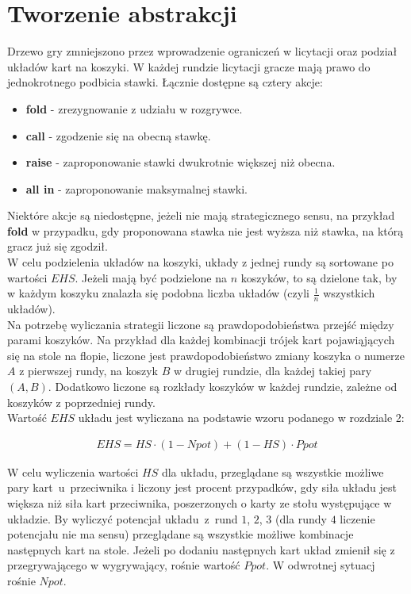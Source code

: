 \documentclass[magisterska]{pracamgr}
\begin{document}
\section{Tworzenie abstrakcji}
\label{koszyki-opis}

Drzewo gry zmniejszono przez wprowadzenie ograniczeń w licytacji oraz podział układów kart na koszyki.
W każdej rundzie licytacji gracze mają prawo do jednokrotnego podbicia stawki. Łącznie dostępne są cztery akcje:

\begin{itemize}
\item \textbf{fold} - zrezygnowanie z udziału w rozgrywce.
\item \textbf{call} - zgodzenie się na obecną stawkę.
\item \textbf{raise} - zaproponowanie stawki dwukrotnie większej niż obecna.
\item \textbf{all in} - zaproponowanie maksymalnej stawki.
\end{itemize}

\noindent
Niektóre akcje są niedostępne, jeżeli nie mają strategicznego sensu, na przykład \textbf{fold} w przypadku, gdy
proponowana stawka nie jest wyższa niż stawka, na którą gracz już się zgodził. \\

\noindent
W celu podzielenia układów na koszyki, układy z jednej rundy są sortowane po wartości $EHS$. Jeżeli mają być podzielone na
$n$ koszyków, to są dzielone tak, by w każdym koszyku znalazła się podobna liczba układów (czyli $\frac{1}{n}$ wszystkich układów). \\

\noindent
Na potrzebę wyliczania strategii liczone są prawdopodobieństwa przejść między parami koszyków. Na przykład dla każdej kombinacji
trójek kart pojawiąjących się na stole na flopie, liczone jest prawdopodobieństwo zmiany koszyka o numerze $A$ z pierwszej
rundy, na koszyk $B$ w drugiej rundzie, dla każdej takiej pary $(A, B)$. Dodatkowo liczone są rozkłady koszyków
w każdej rundzie, zależne od koszyków z poprzedniej rundy. \\

\noindent
Wartość $EHS$ układu jest wyliczana na podstawie wzoru podanego w rozdziale 2:

\begin{align*}
EHS = HS \cdot (1 - Npot) + (1 - HS) \cdot Ppot
\end{align*}

\noindent
W celu wyliczenia wartości $HS$ dla układu, przeglądane są wszystkie możliwe pary kart~u~przeciwnika i liczony jest procent
przypadków, gdy siła układu jest większa niż siła kart przeciwnika, poszerzonych o karty ze stołu występujące w układzie.
By wyliczyć potencjał układu~z~rund $1$, $2$, $3$ (dla rundy $4$ liczenie potencjału nie ma sensu) przeglądane są wszystkie
możliwe kombinacje następnych kart na stole. Jeżeli po dodaniu następnych kart układ zmienił się z przegrywającego w
wygrywający, rośnie wartość $Ppot$. W odwrotnej sytuacj rośnie $Npot$. \\
\end{document}
